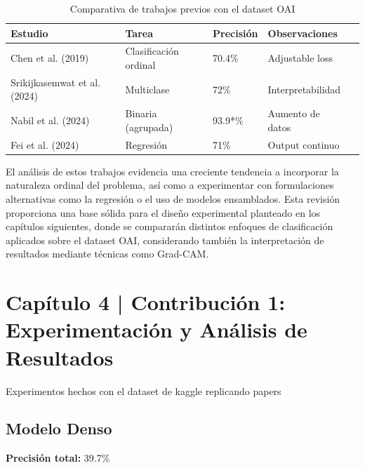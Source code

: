\documentclass[11pt,spanish,listoffigures,listoftables]{tfgetsinf}
\begin{document}
\begin{table}[h]
    \centering
    \caption{Comparativa de trabajos previos con el dataset OAI}
    \label{tab:comparative_oai}
    \begin{tabular}{lllll}
        \toprule
        \textbf{Estudio} & \textbf{Tarea} & \textbf{Precisión} & \textbf{Observaciones} \\
        \midrule
        Chen et al. (2019) & Clasificación ordinal & 70.4\% & Adjustable loss \\
        Srikijkasemwat et al. (2024) & Multiclase & 72\% & Interpretabilidad \\
        Nabil et al. (2024)  & Binaria (agrupada) & 93.9*\%  & Aumento de datos \\
        Fei et al. (2024)  & Regresión & 71\% & Output continuo \\
        \bottomrule
    \end{tabular}
\end{table}

El análisis de estos trabajos evidencia una creciente tendencia a incorporar la naturaleza ordinal del problema, así como a experimentar 
con formulaciones alternativas como la regresión o el uso de modelos ensamblados. Esta revisión proporciona una base sólida para el diseño 
experimental planteado en los capítulos siguientes, donde se compararán distintos enfoques de clasificación aplicados sobre el dataset OAI, 
considerando también la interpretación de resultados mediante técnicas como Grad-CAM.



\chapter{Capítulo 4 | Contribución 1: Experimentación y Análisis de Resultados}
\label{chap:experiments}

Experimentos hechos con el dataset de kaggle replicando papers


\section{Modelo Denso}

\textbf{Precisión total:} 39.7\%
\end{document}
